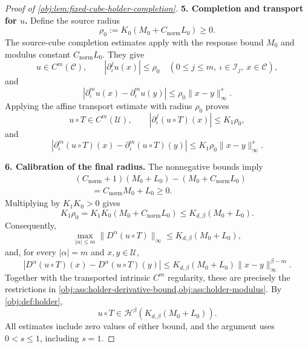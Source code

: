\begin{proof}[Proof of \cref{obj:lem:fixed-cube-holder-completion}]
\textbf{5. Completion and transport for \(u\).}
Define the source radius
\[
\rho_0:=K_0(M_0+C_{\mathrm{norm}}L_0)\ge0.
\]
The source-cube completion estimates apply with the response bound \(M_0\) and modulus constant \(C_{\mathrm{norm}}L_0\). They give
\[
u\in C^m(\mathscr C),\qquad
|\partial_\iota^j u(x)|\le\rho_0
\quad(0\le j\le m,\ \iota\in\mathscr I_j,\ x\in\mathscr C),
\]
and
\[
|\partial_\iota^m u(x)-\partial_\iota^m u(y)|
\le\rho_0\|x-y\|_\infty^s.
\]
Applying the affine transport estimate with radius \(\rho_0\) proves
\[
u\circ T\in C^m(\mathscr U),\qquad
|\partial_\iota^j(u\circ T)(x)|\le K_1\rho_0,
\]
and
\[
|\partial_\iota^m(u\circ T)(x)
-\partial_\iota^m(u\circ T)(y)|
\le K_1\rho_0\|x-y\|_\infty^s.
\]

\textbf{6. Calibration of the final radius.}
The nonnegative bounds imply
\[
\begin{aligned}
&(C_{\mathrm{norm}}+1)(M_0+L_0)
-(M_0+C_{\mathrm{norm}}L_0)\\
&\qquad=C_{\mathrm{norm}}M_0+L_0\ge0.
\end{aligned}
\]
Multiplying by \(K_1K_0>0\) gives
\[
K_1\rho_0
=
K_1K_0(M_0+C_{\mathrm{norm}}L_0)
\le K_{d,\beta}(M_0+L_0).
\]
Consequently,
\[
\max_{|\alpha|\le m}
\|D^\alpha(u\circ T)\|_\infty
\le K_{d,\beta}(M_0+L_0),
\]
and, for every \(|\alpha|=m\) and \(x,y\in\mathscr U\),
\[
|D^\alpha(u\circ T)(x)-D^\alpha(u\circ T)(y)|
\le
K_{d,\beta}(M_0+L_0)\|x-y\|_\infty^{\beta-m}.
\]
Together with the transported intrinsic \(C^m\) regularity, these are precisely the restrictions in
\cref{obj:ass:holder-derivative-bound,obj:ass:holder-modulus}.
By \cref{obj:def:holder},
\[
u\circ T\in
\mathcal H^\beta\!\left(K_{d,\beta}(M_0+L_0)\right).
\]
All estimates include zero values of either bound, and the argument uses \(0<s\le1\), including \(s=1\).
\end{proof}
